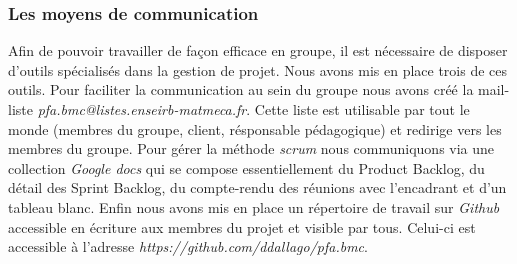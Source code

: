 \subsubsection*{Les moyens de communication}
Afin de pouvoir travailler de façon efficace en groupe, il est nécessaire de disposer d'outils spécialisés dans la gestion de projet.
Nous avons mis en place trois de ces outils.
Pour faciliter la communication au sein du groupe nous avons créé la mail-liste \textit{pfa.bmc@listes.enseirb-matmeca.fr}. Cette liste est utilisable par tout le monde (membres du groupe, client, résponsable pédagogique) et redirige vers les membres du groupe.
Pour gérer la méthode \textit{scrum} nous communiquons via une collection \textit{Google docs} qui se compose essentiellement du Product Backlog, du détail des Sprint Backlog, du compte-rendu des réunions avec l'encadrant et d'un tableau blanc.
Enfin nous avons mis en place un répertoire de travail sur \textit{Github} accessible en écriture aux membres du projet et visible par tous. Celui-ci est accessible à l'adresse \textit{https://github.com/ddallago/pfa.bmc}.

